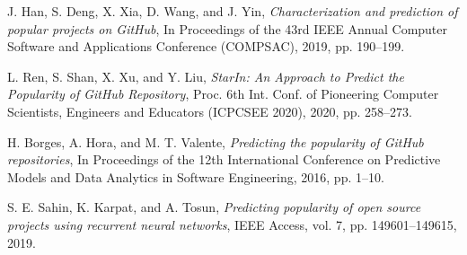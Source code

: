 \documentclass[12pt,a4paper]{article}
\begin{document}
\begin{thebibliography}{9}

J. Han, S. Deng, X. Xia, D. Wang, and J. Yin,  
\textit{Characterization and prediction of popular projects on GitHub},  
In Proceedings of the 43rd IEEE Annual Computer Software and Applications Conference (COMPSAC), 2019, pp. 190--199.


 L. Ren, S. Shan, X. Xu, and Y. Liu, \textit{StarIn: An Approach to Predict the Popularity of GitHub Repository}, Proc. 6th Int. Conf. of Pioneering Computer Scientists, Engineers and Educators (ICPCSEE 2020), 2020, pp. 258--273.

H. Borges, A. Hora, and M. T. Valente,
\textit{Predicting the popularity of GitHub repositories},
In Proceedings of the 12th International Conference on Predictive Models and Data Analytics in Software Engineering, 2016, pp. 1--10.

S. E. Sahin, K. Karpat, and A. Tosun,  
\textit{Predicting popularity of open source projects using recurrent neural networks},  
IEEE Access, vol. 7, pp. 149601--149615, 2019.

\end{thebibliography}
\end{document}
